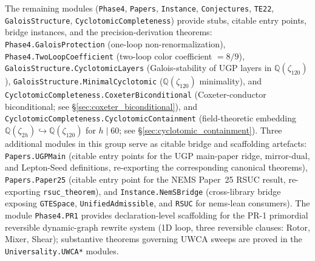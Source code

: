 \documentclass[11pt,a4paper]{article}
\theoremstyle{definition}
\begin{document}
\noindent
The remaining modules (\texttt{Phase4}, \texttt{Papers},
\texttt{Instance}, \texttt{Conjectures}, \texttt{TE22},
\texttt{GaloisStructure}, \texttt{CyclotomicCompleteness}) provide stubs, citable
entry points, bridge instances, and the precision-derivation theorems:
\texttt{Phase4.GaloisProtection} (one-loop non-renormalization),
\texttt{Phase4.TwoLoopCoefficient} (two-loop color coefficient $= 8/9$),
\texttt{GaloisStructure.CyclotomicLayers} (Galois-stability of UGP layers in
$\mathbb{Q}(\zeta_{120})$), \texttt{GaloisStructure.MinimalCyclotomic}
($\mathbb{Q}(\zeta_{120})$ minimality), and
\texttt{CyclotomicCompleteness.CoxeterBiconditional} (Coxeter-conductor
biconditional; see \S\ref{sec:coxeter_biconditional}), and
\texttt{CyclotomicCompleteness.CyclotomicContainment} (field-theoretic embedding
$\mathbb{Q}(\zeta_{2h}) \hookrightarrow \mathbb{Q}(\zeta_{120})$ for $h \mid 60$;
see \S\ref{sec:cyclotomic_containment}).
Three additional modules in this group serve as citable bridge and scaffolding
artefacts: \texttt{Papers.UGPMain} (citable entry points for the UGP main-paper
ridge, mirror-dual, and Lepton-Seed definitions, re-exporting the corresponding
canonical theorems), \texttt{Papers.Paper25} (citable entry point for the NEMS
Paper~25 RSUC result, re-exporting \texttt{rsuc\_theorem}), and
\texttt{Instance.NemSBridge} (cross-library bridge exposing \texttt{GTESpace},
\texttt{UnifiedAdmissible}, and \texttt{RSUC} for nems-lean consumers).
The module \texttt{Phase4.PR1} provides declaration-level scaffolding for the
PR-1 primordial reversible dynamic-graph rewrite system (1D loop, three reversible
clauses: Rotor, Mixer, Shear); substantive theorems governing UWCA sweeps are
proved in the \texttt{Universality.UWCA*} modules.
\end{document}
